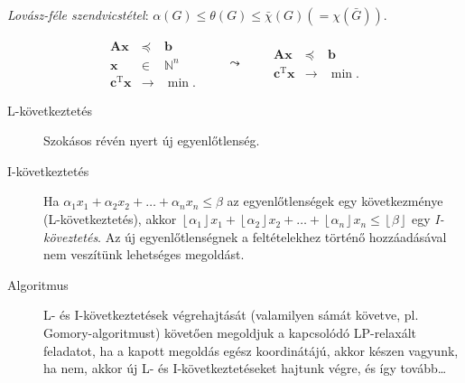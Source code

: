 \documentclass[%
	DIV=15,appendixprefix]{scrreprt}
\theoremstyle{definition}
\theoremstyle{remark}
\DeclareMathOperator{\T}{T}
\begin{document}
\begin{description}
		\emph{Lovász-féle szendvicstétel}: $ \alpha \left( G \right) \le \theta \left( G \right) \le
		\bar{ \chi } \left( G \right) \left( = \chi \left( \bar{ G } \right) \right) $.
\end{description}
%
\begin{equation}\tag{IP és LP-relaxáltja}
	\begin{array}{rcl}
		\mathbf{ A } \mathbf{ x } 			&	\preceq		&	\mathbf{ b }\\
		\mathbf{ x } 						&	\in			&	\mathbb{ N }^{ n }\\
		\hline
		\mathbf{ c }^{ \T } \mathbf{ x }	&	\rightarrow	&	\min.
	\end{array} \qquad \leadsto \qquad \begin{array}{rcl}
		\mathbf{ A } \mathbf{ x } 			&	\preceq		&	\mathbf{ b }\\
		\hline
		\mathbf{ c }^{ \T } \mathbf{ x }	&	\rightarrow	&	\min.
	\end{array}
\end{equation}
\begin{description}
	\item[L-következtetés] Szokásos  révén nyert új egyenlőtlenség.
	\item[I-következtetés] Ha $ \alpha_{ 1 } x_{ 1 } + \alpha_{ 2 } x_{ 2 } + \ldots +
		\alpha_{ n } x_{ n } \le \beta $ az egyenlőtlenségek egy következménye
		(L-következtetés), akkor $ \left\lfloor \alpha_{ 1 } \right\rfloor x_{ 1 } +
		\left\lfloor \alpha_{ 2 } \right\rfloor x_{ 2 } + \ldots + \left\lfloor \alpha_{ n }
		\right\rfloor x_{ n } \le \left\lfloor \beta \right\rfloor $ egy \emph{I-köveztetés}. Az
		új egyenlőtlenségnek a feltételekhez történő hozzáadásával nem veszítünk lehetséges
		megoldást.
	\item[Algoritmus] L- és I-következtetések végrehajtását (valamilyen sámát követve, pl.
		Gomory-al\-go\-rit\-must) követően megoldjuk a kapcsolódó LP-relaxált feladatot, ha a kapott
		megoldás egész koordinátájú, akkor készen vagyunk, ha nem, akkor új L- és
		I-következtetéseket hajtunk végre, és így tovább\ldots
\end{description}
\end{document}
